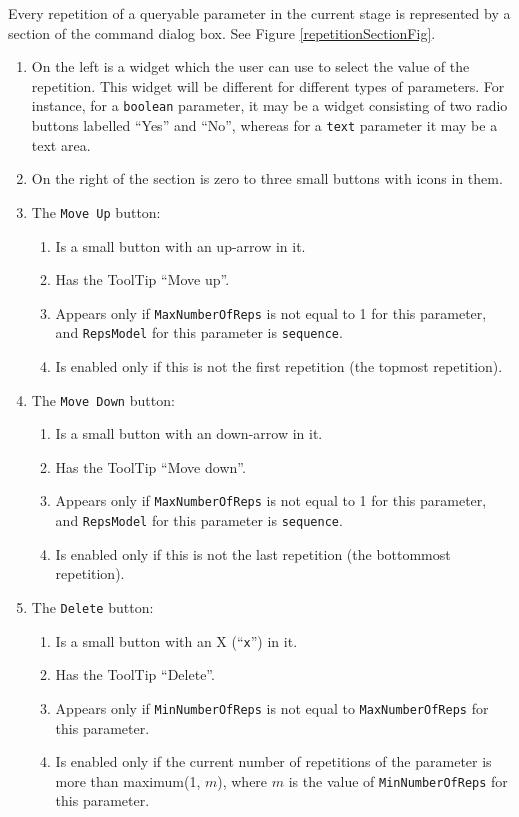 \documentclass[11pt]{article}
\begin{document}
Every repetition of a queryable parameter in the current stage is
represented by a section of the command dialog box.  See Figure
\ref{repetitionSectionFig}.
\begin{enumerate}
\item On the left is a widget which the user can use to select the
  value of the repetition.  This widget will be different for different
  types of parameters.  For instance, for a {\tt boolean} parameter,
  it may be a widget consisting of two radio buttons labelled ``Yes''
  and ``No'', whereas for a {\tt text} parameter it may be a
  text area.
\item On the right of the section is zero to three small buttons
  with icons in them.
\item The {\tt Move Up} button:
  \begin{enumerate}
  \item Is a small button with an up-arrow in it.
  \item Has the ToolTip ``Move up''.
  \item Appears only if
    {\tt MaxNumberOfReps} is not equal to 1 for this parameter, and
    {\tt RepsModel} for this parameter is {\tt sequence}.
  \item Is enabled only if this is not the first repetition (the topmost
    repetition).
  \end{enumerate}
\item The {\tt Move Down} button:
  \begin{enumerate}
  \item Is a small button with an down-arrow in it.
  \item Has the ToolTip ``Move down''.
  \item Appears only if
    {\tt MaxNumberOfReps} is not equal to 1 for this parameter, and
    {\tt RepsModel} for this parameter is {\tt sequence}.
  \item Is enabled only if this is not the last repetition (the bottommost
    repetition).
  \end{enumerate}
\item The {\tt Delete} button:
  \begin{enumerate}
  \item Is a small button with an X (``\verb/x/'') in it.
  \item Has the ToolTip ``Delete''.
  \item Appears only if {\tt MinNumberOfReps} is not equal to
    {\tt MaxNumberOfReps} for this parameter.
  \item Is enabled only if the current number of repetitions of the
    parameter is more than maximum(1, $m$), where $m$ is the value
    of {\tt MinNumberOfReps} for this parameter.
  \end{enumerate}
\end{enumerate}
\end{document}
